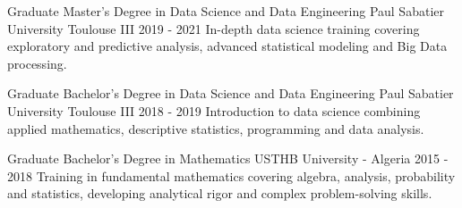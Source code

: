 


\begin{cventries}


\cventry
{Graduate} %
{Master's Degree in Data Science and Data Engineering} %
{Paul Sabatier University Toulouse III} %
{2019 - 2021} %
{In-depth data science training covering exploratory and predictive analysis, advanced statistical modeling and Big Data processing.} %



\cventry
{Graduate} %
{Bachelor's Degree in Data Science and Data Engineering} %
{Paul Sabatier University Toulouse III} %
{2018 - 2019} %
{Introduction to data science combining applied mathematics, descriptive statistics, programming and data analysis.} %


\cventry
{Graduate} %
{Bachelor's Degree in Mathematics} %
{USTHB University - Algeria} %
{2015 - 2018} %
{Training in fundamental mathematics covering algebra, analysis, probability and statistics, developing analytical rigor and complex problem-solving skills.} %



\end{cventries}
